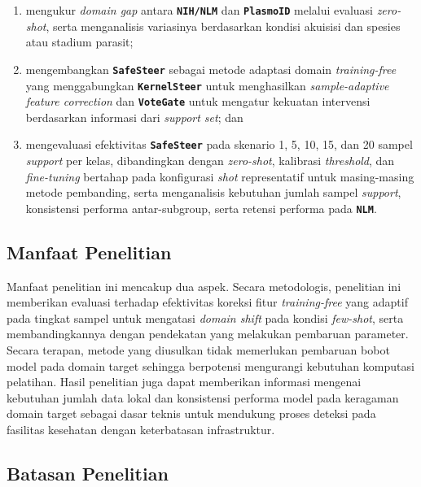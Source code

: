 \documentclass[conference]{IEEEtran}
\newcommand{\nama}[1]{\textbf{\texttt{#1}}}
\begin{document}
\begin{enumerate}
    \item mengukur \textit{domain gap} antara \nama{NIH/NLM} dan \nama{PlasmoID} melalui evaluasi \textit{zero-shot}, serta menganalisis variasinya berdasarkan kondisi akuisisi dan spesies atau stadium parasit;

    \item mengembangkan \nama{SafeSteer} sebagai metode adaptasi domain \textit{training-free} yang menggabungkan \nama{KernelSteer} untuk menghasilkan \textit{sample-adaptive feature correction} dan \nama{VoteGate} untuk mengatur kekuatan intervensi berdasarkan informasi dari \textit{support set}; dan

    \item mengevaluasi efektivitas \nama{SafeSteer} pada skenario 1, 5, 10, 15, dan 20 sampel \textit{support} per kelas, dibandingkan dengan \textit{zero-shot}, kalibrasi \textit{threshold}, dan \textit{fine-tuning} bertahap pada konfigurasi \textit{shot} representatif untuk masing-masing metode pembanding, serta menganalisis kebutuhan jumlah sampel \textit{support}, konsistensi performa antar-subgroup, serta retensi performa pada \nama{NLM}.

\end{enumerate} 

\subsection{Manfaat Penelitian}

Manfaat penelitian ini mencakup dua aspek. Secara metodologis, penelitian ini memberikan evaluasi terhadap efektivitas koreksi fitur \textit{training-free} yang adaptif pada tingkat sampel untuk mengatasi \textit{domain shift} pada kondisi \textit{few-shot}, serta membandingkannya dengan pendekatan yang melakukan pembaruan parameter. Secara terapan, metode yang diusulkan tidak memerlukan pembaruan bobot model pada domain target sehingga berpotensi mengurangi kebutuhan komputasi pelatihan. Hasil penelitian juga dapat memberikan informasi mengenai kebutuhan jumlah data lokal dan konsistensi performa model pada keragaman domain target sebagai dasar teknis untuk mendukung proses deteksi pada fasilitas kesehatan dengan keterbatasan infrastruktur.

\subsection{Batasan Penelitian}
\end{document}

